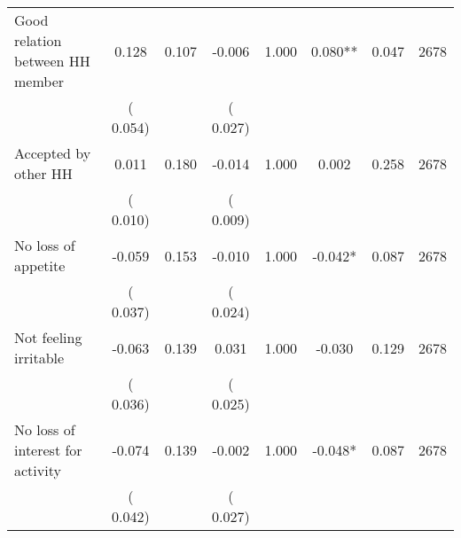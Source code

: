 \begin{tabular}{l*{7}{c}}
 Good relation between HH member       &              0.128       &        0.107  &             -0.006       &        1.000  &              0.080**       &              0.047 &  2678 \\ 
                       &       (       0.054)             &                               &       (       0.027)                     &                               &                                               &                                &                      \\ 

 Accepted by other HH       &              0.011       &        0.180  &             -0.014       &        1.000  &              0.002       &              0.258 &  2678 \\ 
                       &       (       0.010)             &                               &       (       0.009)                     &                               &                                               &                                &                      \\ 

 No loss of appetite       &             -0.059       &        0.153  &             -0.010       &        1.000  &             -0.042*       &              0.087 &  2678 \\ 
                       &       (       0.037)             &                               &       (       0.024)                     &                               &                                               &                                &                      \\ 

 Not feeling irritable       &             -0.063       &        0.139  &              0.031       &        1.000  &             -0.030       &              0.129 &  2678 \\ 
                       &       (       0.036)             &                               &       (       0.025)                     &                               &                                               &                                &                      \\ 

 No loss of interest for activity       &             -0.074       &        0.139  &             -0.002       &        1.000  &             -0.048*       &              0.087 &  2678 \\ 
                       &       (       0.042)             &                               &       (       0.027)                     &                               &                                               &                                &                      \\ 


\end{tabular}
